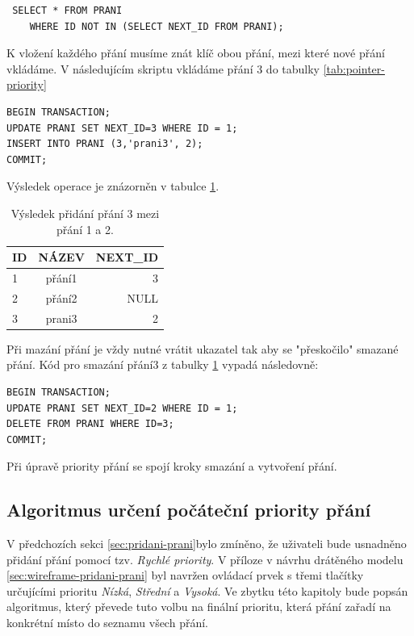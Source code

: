\begin{lstlisting}
 SELECT * FROM PRANI
    WHERE ID NOT IN (SELECT NEXT_ID FROM PRANI);
\end{lstlisting}

K vložení každého přání musíme znát klíč obou přání, mezi které nové přání vkládáme. V následujícím skriptu vkládáme přání 3 do tabulky \ref{tab:pointer-priority}

\begin{lstlisting}
BEGIN TRANSACTION;
UPDATE PRANI SET NEXT_ID=3 WHERE ID = 1;
INSERT INTO PRANI (3,'prani3', 2);
COMMIT;
\end{lstlisting}

Výsledek operace je znázorněn v tabulce \ref{tab:pointer-priority-result}.

\begin{table}[htb]
	\begin{center}
	  \begin{tabular}{ | l | c | r | }
	    \hline
	    ID & NÁZEV & NEXT\_ID  \\ \hline \hline
	    1 & přání1 & 3  \\ \hline
	    2 & přání2 & NULL \\ \hline
	    3 & prani3 & 2 \\ \hline
	  \end{tabular}
	  \caption{Výsledek přidání přání 3 mezi přání 1 a 2.}
	  \label{tab:pointer-priority-result}
	\end{center}
\end{table}

Při mazání přání je vždy nutné vrátit ukazatel tak aby se "přeskočilo" smazané přání. Kód pro smazání přání3 z tabulky \ref{tab:pointer-priority-result} vypadá následovně:

\begin{lstlisting}
BEGIN TRANSACTION;
UPDATE PRANI SET NEXT_ID=2 WHERE ID = 1;
DELETE FROM PRANI WHERE ID=3;
COMMIT;
\end{lstlisting}

Při úpravě priority přání se spojí kroky smazání a vytvoření přání.

\subsection{Algoritmus určení počáteční priority přání}
V předchozích sekci \ref{sec:pridani-prani}bylo zmíněno, že uživateli bude usnadněno přidání přání pomocí tzv. \emph{Rychlé priority}. V příloze v návrhu drátěného modelu \ref{sec:wireframe-pridani-prani} byl navržen ovládací prvek s třemi tlačítky určujícími prioritu \emph{Nízká}, \emph{Střední} a \emph{Vysoká}. Ve zbytku této kapitoly bude popsán algoritmus, který převede tuto volbu na finální prioritu, která přání zařadí na konkrétní místo do seznamu všech přání.

